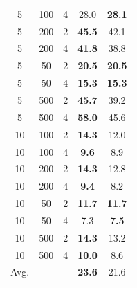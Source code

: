 \begin{table}[t]
\begin{minipage}{0.48\textwidth}
{\begin{tabular}{ccc|cc}
 5 & 100 & 4 & 28.0 & \textbf{28.1} \\
 5 & 200 & 2 & \textbf{45.5} & 42.1 \\
 5 & 200 & 4 & \textbf{41.8} & 38.8 \\
 5 &  50 & 2 & \textbf{20.5} & \textbf{20.5} \\
 5 &  50 & 4 & \textbf{15.3} & \textbf{15.3} \\
 5 & 500 & 2 & \textbf{45.7} & 39.2 \\
 5 & 500 & 4 & \textbf{58.0} & 45.6 \\ \hline
 10 & 100 & 2 & \textbf{14.3} & 12.0 \\
 10 & 100 & 4 & \textbf{9.6} & 8.9 \\
 10 & 200 & 2 & \textbf{14.3} & 12.8 \\
 10 & 200 & 4 & \textbf{9.4} & 8.2 \\
 10 &  50 & 2 & \textbf{11.7} & \textbf{11.7} \\
 10 &  50 & 4 & 7.3 & \textbf{7.5} \\
 10 & 500 & 2 & \textbf{14.3} & 13.2 \\
 10 & 500 & 4 & \textbf{10.0} & 8.6 \\
				\hline \hline
Avg. &    &   &   \textbf{23.6}    & 21.6 \\ \hline \hline
		\end{tabular}}
	\end{minipage}
	
\end{table}